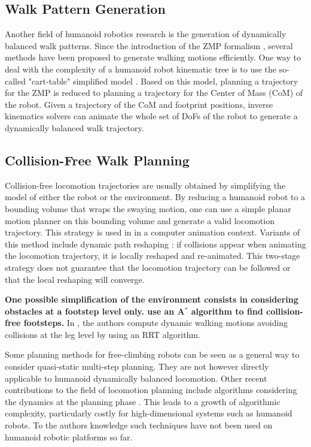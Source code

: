 \documentclass{article}
\begin{document}
\subsection{Walk Pattern Generation}

Another  field of  humanoid  robotics research  is  the generation  of
dynamically balanced walk patterns. Since  the introduction of  the ZMP
formalism  \cite{vukobratovic1969contribution},  several  methods  have  been  proposed  to
generate  walking  motions efficiently.   One  way  to  deal with  the
complexity  of a  humanoid  robot  kinematic tree  is  to use  the
so-called "cart-table" simplified model \cite{kajita2003biped}. Based on this
model,  planning a trajectory  for the  ZMP is  reduced to  planning a
trajectory  for  the Center  of  Mass (CoM)  of  the  robot.  Given  a
trajectory  of  the CoM  and  footprint  positions, inverse  kinematics
solvers can animate  the whole set of DoFs of the
robot to generate a dynamically balanced walk trajectory.


\subsection{Collision-Free Walk Planning}

Collision-free  locomotion   trajectories  are  usually   obtained  by
simplifying the model of either the  robot or the environment. By reducing 
a  humanoid robot to a bounding volume that wraps the swaying motion,
one can  use a simple  planar motion planner  on this bounding  volume and
generate  a valid  locomotion  trajectory. This  strategy  is used  in
\cite{pettre20032} in a computer animation context. Variants of this method
include  dynamic path reshaping  \cite{yoshida-humanoids05}: if  collisions appear
when animating  the locomotion  trajectory, it is  locally reshaped
and re-animated.  This two-stage  strategy does not guarantee that the
locomotion trajectory can be followed or that the local reshaping will
converge.

\textbf{One possible simplification of the environment consists in
  considering obstacles at a footstep level only.
  \cite{kuffner2001footstep,chestnutt2005footstep,kuffner2005motion}
  use an A$^{*}$ algorithm to find collision-free footsteps.}  In
\cite{perrin2012fast}, the authors compute dynamic walking motions
avoiding collisions at the leg level by using an RRT algorithm.

Some planning methods for free-climbing robots \cite{bretl2006motion}
can be seen as a general way 
to consider quasi-static multi-step planning. They are not however directly applicable to
humanoid dynamically balanced locomotion.
Other recent contributions to the field of locomotion planning  include algorithms 
considering the dynamics at the planning phase \cite{shkolnik2011bounding}. This leads to 
a growth of algorithmic complexity, particularly costly for high-dimensional
systems such as humanoid robots. To the authors knowledge such techniques have not been
used on humanoid robotic platforms so far.
\end{document}
